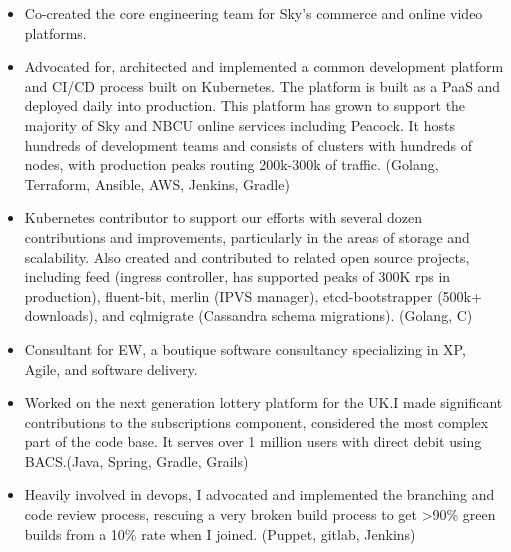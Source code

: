 \documentclass[11pt,a4paper,roman]{moderncv}
\begin{document}
\vspace{5mm}

\begin{itemize}
  \item Co-created the core engineering team for Sky's commerce and online video platforms.
  \item Advocated for, architected and implemented a common development platform and CI/CD process built on
        Kubernetes. The platform is built as a PaaS and deployed daily into production. This platform has
        grown to support the majority of Sky and NBCU online services including Peacock. It hosts hundreds
        of development teams and consists of clusters with hundreds of nodes, with production peaks routing
        200k-300k of traffic. (Golang, Terraform, Ansible, AWS, Jenkins, Gradle)
  \item Kubernetes contributor to support our efforts with several dozen contributions and improvements,
        particularly in the areas of storage and scalability. Also created and contributed to related
        open source projects, including feed (ingress controller, has supported peaks of 300K rps in production),
        fluent-bit, merlin (IPVS manager), etcd-bootstrapper (500k+ downloads), and cqlmigrate
        (Cassandra schema migrations). (Golang, C)
\end{itemize}

\vspace{5mm}

\begin{itemize}
\item Consultant for EW, a boutique software consultancy specializing in XP, Agile, and software delivery.
\end{itemize}

\vspace{5mm}

\begin{itemize}
  \item Worked on the next generation lottery platform for the UK.\@ I made significant contributions
        to the subscriptions component, considered the most complex part of the code base. It serves
        over 1 million users with direct debit using BACS.\@ (Java, Spring, Gradle, Grails)
  \item Heavily involved in devops, I advocated and implemented the branching and code review process,
        rescuing a very broken build process to get >90\% green builds from a 10\% rate when I joined.
        (Puppet, gitlab, Jenkins)
\end{itemize}
\end{document}
